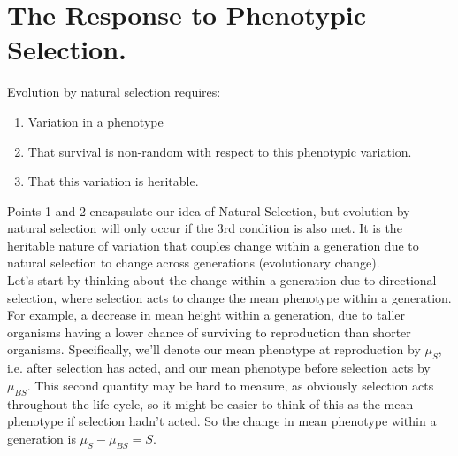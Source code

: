 \chapter{The Response to Phenotypic Selection.}
Evolution by natural selection requires:
\begin{enumerate}
\item Variation in a phenotype
\item That survival is non-random with respect to this phenotypic
variation.
\item That this variation is heritable.
\end{enumerate}
Points 1 and 2 encapsulate our idea of Natural Selection, but evolution by natural
selection will only occur if the 3rd condition is also
met.  It is the
heritable nature of variation that couples change within a generation
due to natural selection to change across generations (evolutionary
change). \\

Let's start by thinking about the change within a generation due
to directional selection, where selection acts to change the mean
phenotype within a generation. For example, a decrease in mean height within a
generation, due to taller organisms having a lower chance of surviving
to reproduction than shorter organisms. Specifically, we'll denote our mean phenotype at
reproduction by $\mu_S$, i.e. after selection has acted, and our mean
phenotype before selection acts by $\mu_{BS}$. This second quantity may be hard to
measure, as obviously selection acts throughout the life-cycle, so it
might be easier to think of this as the mean phenotype if selection
hadn't acted. So the change in mean phenotype within a generation is $\mu_{S} - \mu_{BS}= S$.  \\

